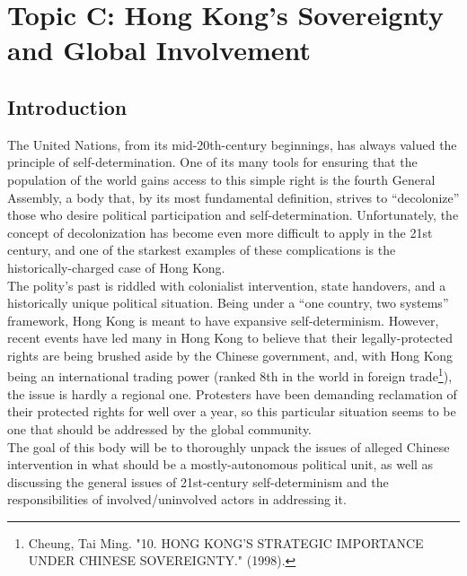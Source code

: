 \documentclass[10pt, letterpaper]{article}
\begin{document}
\newpage
\section{Topic C: Hong Kong's Sovereignty and Global Involvement}

\subsection{Introduction}

The United Nations, from its mid-20th-century beginnings, has always
valued the principle of self-determination. One of its many tools for
ensuring that the population of the world gains access to this simple
right is the fourth General Assembly, a body that, by its most
fundamental definition, strives to ``decolonize'' those who desire
political participation and self-determination. Unfortunately, the
concept of decolonization has become even more difficult to apply in the
21st century, and one of the starkest examples of these complications is
the historically-charged case of Hong Kong. \\

The polity's past is riddled with colonialist intervention, state
handovers, and a historically unique political situation. Being under a
``one country, two systems'' framework, Hong Kong is meant to have
expansive self-determinism. However, recent events have led many in Hong
Kong to believe that their legally-protected rights are being brushed
aside by the Chinese government, and, with Hong Kong being an
international trading power (ranked 8th in the world in foreign
trade\footnote{Cheung, Tai Ming. "10. HONG KONG'S STRATEGIC IMPORTANCE
  UNDER CHINESE SOVEREIGNTY." (1998).}), the issue is hardly a regional
one. Protesters have been demanding reclamation of their protected
rights for well over a year, so this particular situation seems to be
one that should be addressed by the global community. \\

The goal of this body will be to thoroughly unpack the issues of alleged
Chinese intervention in what should be a mostly-autonomous political
unit, as well as discussing the general issues of 21st-century
self-determinism and the responsibilities of involved/uninvolved actors
in addressing it. \\
\end{document}
